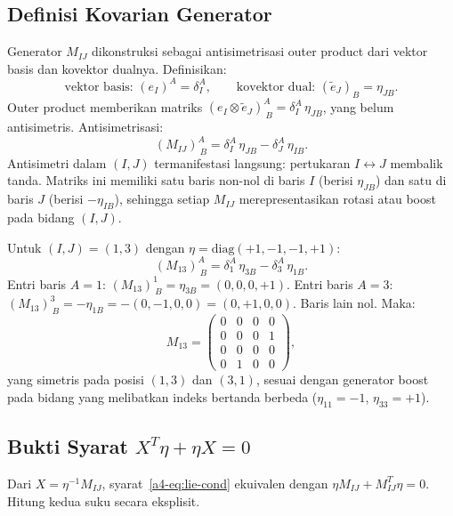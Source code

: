 \subsection{Definisi Kovarian Generator}

Generator $M_{IJ}$ dikonstruksi sebagai antisimetrisasi outer product dari vektor basis dan kovektor dualnya. Definisikan:
\begin{equation}
    \text{vektor basis: } (e_I)^A = \delta^A_I, \qquad
    \text{kovektor dual: } (\tilde{e}_J)_B = \eta_{JB}.
\end{equation}
Outer product memberikan matriks $(e_I \otimes \tilde{e}_J)^A_{\ B} = \delta^A_I\,\eta_{JB}$, yang belum antisimetris. Antisimetrisasi:
\begin{equation}\label{a4-eq:MIJ-def}
    (M_{IJ})^A_{\ B} = \delta^A_I\,\eta_{JB} - \delta^A_J\,\eta_{IB}.
\end{equation}
Antisimetri dalam $(I,J)$ termanifestasi langsung: pertukaran $I \leftrightarrow J$ membalik tanda. Matriks ini memiliki satu baris non-nol di baris $I$ (berisi $\eta_{JB}$) dan satu di baris $J$ (berisi $-\eta_{IB}$), sehingga setiap $M_{IJ}$ merepresentasikan rotasi atau boost pada bidang $(I,J)$.

\vspace{0.5em}
Untuk $(I,J) = (1,3)$ dengan $\eta = \mathrm{diag}(+1,-1,-1,+1)$:
\begin{equation}
    (M_{13})^A_{\ B} = \delta^A_1\,\eta_{3B} - \delta^A_3\,\eta_{1B}.
\end{equation}
Entri baris $A = 1$: $(M_{13})^1_{\ B} = \eta_{3B} = (0,0,0,+1)$. Entri baris $A = 3$: $(M_{13})^3_{\ B} = -\eta_{1B} = -(0,-1,0,0) = (0,+1,0,0)$. Baris lain nol. Maka:
\begin{equation}
    M_{13} = \begin{pmatrix}0&0&0&0\\0&0&0&1\\0&0&0&0\\0&1&0&0\end{pmatrix},
\end{equation}
yang simetris pada posisi $(1,3)$ dan $(3,1)$, sesuai dengan generator boost pada bidang yang melibatkan indeks bertanda berbeda ($\eta_{11} = -1$, $\eta_{33} = +1$).

\subsection{Bukti Syarat $X^T\eta + \eta X = 0$}

Dari $X = \eta^{-1}M_{IJ}$, syarat~\eqref{a4-eq:lie-cond} ekuivalen dengan $\eta M_{IJ} + M_{IJ}^T\eta = 0$. Hitung kedua suku secara eksplisit.

